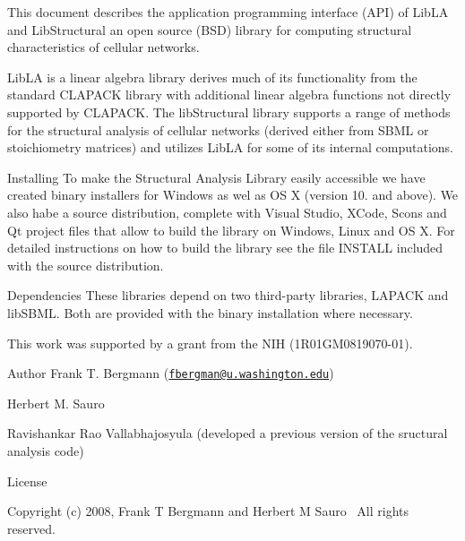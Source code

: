 \begin{DoxyParagraph}{}
This document describes the application programming interface (A\+PI) of Lib\+LA and Lib\+Structural an open source (B\+SD) library for computing structural characteristics of cellular networks. 
\end{DoxyParagraph}
\begin{DoxyParagraph}{}
Lib\+LA is a linear algebra library derives much of its functionality from the standard C\+L\+A\+P\+A\+CK library with additional linear algebra functions not directly supported by C\+L\+A\+P\+A\+CK. The lib\+Structural library supports a range of methods for the structural analysis of cellular networks (derived either from S\+B\+ML or stoichiometry matrices) and utilizes Lib\+LA for some of its internal computations. 
\end{DoxyParagraph}
\begin{DoxyParagraph}{Installing}
To make the Structural Analysis Library easily accessible we have created binary installers for Windows as wel as OS X (version 10. and above). We also habe a source distribution, complete with Visual Studio, X\+Code, Scons and Qt project files that allow to build the library on Windows, Linux and OS X. For detailed instructions on how to build the library see the file I\+N\+S\+T\+A\+LL included with the source distribution. 
\end{DoxyParagraph}
\begin{DoxyParagraph}{Dependencies}
These libraries depend on two third-\/party libraries, L\+A\+P\+A\+CK and lib\+S\+B\+ML. Both are provided with the binary installation where necessary. 
\end{DoxyParagraph}
\begin{DoxyParagraph}{}
This work was supported by a grant from the N\+IH (1\+R01\+G\+M0819070-\/01).
\end{DoxyParagraph}
\begin{DoxyAuthor}{Author}
Frank T. Bergmann (\href{mailto:fbergman@u.washington.edu}{\tt fbergman@u.\+washington.\+edu}) 

Herbert M. Sauro 

Ravishankar Rao Vallabhajosyula (developed a previous version of the sructural analysis code)
\end{DoxyAuthor}
\begin{DoxyParagraph}{License}

\end{DoxyParagraph}
\begin{DoxyParagraph}{}
Copyright (c) 2008, Frank T Bergmann and Herbert M Sauro~\newline
All rights reserved.
\end{DoxyParagraph}
